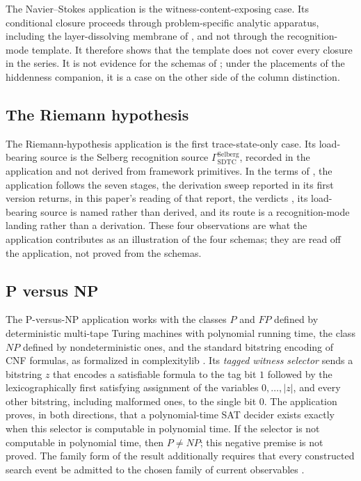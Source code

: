 The Navier--Stokes application is the witness-content-exposing case.
Its conditional closure proceeds through problem-specific analytic
apparatus, including the layer-dissolving membrane of
\cite{Tsiokos2026NeedleKiller,Tsiokos2026NavierStokes}, and not through
the recognition-mode template.  It therefore shows that the template
does not cover every closure in the series.  It is not evidence for the
schemas of ; under the placements of the
hiddenness companion, it is a case on the other side of the column
distinction.

\subsection{The Riemann hypothesis}\label{sec:validation:rh}

The Riemann-hypothesis application is the first trace-state-only case.
Its load-bearing source is the Selberg recognition source
\(\Gamma_{\mathrm{SDTC}}^{\mathrm{Selberg}}\), recorded in the
application \cite{Tsiokos2026RH} and not derived from framework
primitives.  In the terms of , the application
follows the seven stages, the derivation sweep reported in its first
version \cite{Tsiokos2026RHvOne} returns, in this paper's reading of
that report, the verdicts \SigPattern, its load-bearing source is named rather than derived, and
its route is a recognition-mode landing rather than a derivation.  These
four observations are what the application contributes as an
illustration of the four schemas; they are read off the application,
not proved from the schemas.

\subsection{P versus NP}\label{sec:validation:pvnp}

The P-versus-NP application works with the classes \(P\) and \(FP\)
defined by deterministic multi-tape Turing machines with polynomial
running time, the class \(NP\) defined by nondeterministic ones, and
the standard bitstring encoding of
CNF formulas, as formalized in complexitylib
\cite{Schlesinger2026Complexitylib}.  Its \emph{tagged witness
selector} sends a bitstring \(z\) that encodes a satisfiable formula to
the tag bit \(1\) followed by the lexicographically first satisfying
assignment of the variables \(0,\ldots,|z|\), and every other bitstring,
including malformed ones, to the single bit \(0\).  The application proves, in both directions, that a
polynomial-time SAT decider exists exactly when this selector is
computable in polynomial time.  If the selector is not computable in polynomial time,
then \(P\neq NP\); this negative premise is not proved.  The family
form of the result additionally requires that every constructed search
event be admitted to the chosen family of current observables
\cite{Tsiokos2026PvNP}.

